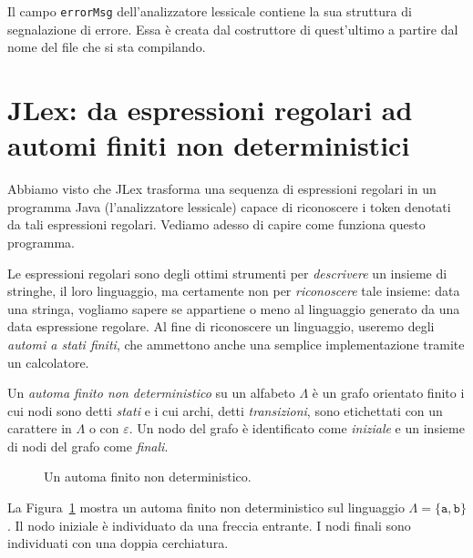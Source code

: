 Il campo \texttt{errorMsg} dell'analizzatore lessicale
contiene la sua struttura di segnalazione di errore.
Essa \`e creata dal costruttore di
quest'ultimo a partire dal nome del file che si sta compilando.
%
\section{JLex: da espressioni regolari ad automi finiti non deterministici}
  \label{sec:nfa}
%
Abbiamo visto che JLex trasforma una sequenza di espressioni regolari
in un programma Java (l'analizzatore lessicale)
capace di riconoscere i token denotati da tali
espressioni regolari. Vediamo adesso di capire come funziona questo programma.

Le espressioni regolari sono degli ottimi strumenti per \emph{descrivere}
un insieme di stringhe, il loro linguaggio, ma certamente non per
\emph{riconoscere} tale insieme: data una stringa, vogliamo sapere se
appartiene o meno al linguaggio generato da una data espressione regolare.
Al fine di riconoscere un linguaggio, useremo degli \emph{automi a stati
finiti}, che ammettono anche una semplice implementazione tramite un
calcolatore.
%
\begin{definition}\label{def:nfa}
Un \emph{automa finito non deterministico} su un alfabeto $\Lambda$ \`e un
grafo orientato finito i cui nodi sono detti \emph{stati} e i cui archi, detti
\emph{transizioni}, sono etichettati con un carattere in $\Lambda$ o con
$\varepsilon$. Un nodo del grafo \`e identificato come \emph{iniziale}
e un insieme di nodi del grafo come \emph{finali}.
\end{definition}
%
\begin{figure}[t]
\begin{center}
\end{center}
\caption{Un automa finito non deterministico.}\label{fig:nfa}
\end{figure}
%
\noindent
La Figura~\ref{fig:nfa} mostra un automa finito non deterministico
sul linguaggio $\Lambda=\{\mathtt{a},\mathtt{b}\}$. Il nodo iniziale
\`e individuato da una freccia entrante. I nodi finali sono individuati
con una doppia cerchiatura.

